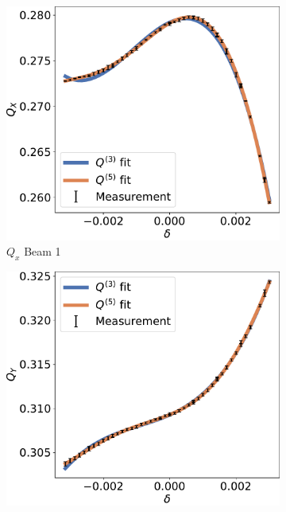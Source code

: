\begin{figure}[!htb]
    \begin{subfigure}{0.49\textwidth}
        \centering
        \includegraphics[width=\textwidth]{./images/higher_orders/fidel_chroma/Beam1_Qx.pdf}
        \caption{$Q_x$ Beam 1}
    \end{subfigure}
    \hfill
    \begin{subfigure}{0.49\textwidth}
        \centering
        \includegraphics[width=\textwidth]{./images/higher_orders/fidel_chroma/Beam1_Qy.pdf}

\end{subfigure}
\end{figure}
